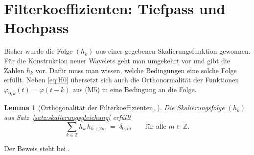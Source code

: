 \documentclass[a4paper,11pt,bibliography=totoc,listof=totoc,headinclude=true,cleardoublepage=empty,oneside]{scrbook}
\theoremstyle{plain}
\newtheorem{Lemma}[Satz]{Lemma}
\theoremstyle{definition}
\newcommand{\Z}{\mathbb{Z}}
\newcommand{\scal}[2]{\langle #1, #2 \rangle}
\begin{document}
\section{Filterkoeffizienten: Tiefpass und Hochpass}
\label{sec:filter}

Bisher wurde die Folge $(h_k)$ aus einer gegebenen Skalierungsfunktion
gewonnen. Für die Konstruktion neuer Wavelets geht man umgekehrt vor und gibt
die Zahlen $h_k$ vor. Dafür muss man wissen, welche Bedingungen eine solche
Folge erfüllt. Neben \eqref{eq:H0} übersetzt sich auch die Orthonormalität der
Funktionen $\varphi_{0,k}(t) = \varphi(t-k)$ aus (M5) in eine Bedingung an die
Folge.

\begin{Lemma}[Orthogonalität der Filterkoeffizienten, {\cite[Lemma~2.2.8]{lmr}}] %
\label{lem:h-orthogonal}
Die Skalierungsfolge $(h_k)$ aus Satz~\ref{satz:skalierungsgleichung} erfüllt
\begin{equation}
\label{eq:h-orthogonal}
  \sum_{k\in\Z} h_k\,h_{k+2m} \;=\; \delta_{0,m}
  \qquad\text{für alle } m\in\Z .
\end{equation}
\end{Lemma}

Der Beweis steht bei \cite[Lemma~2.2.8]{lmr}. %

\end{document}
